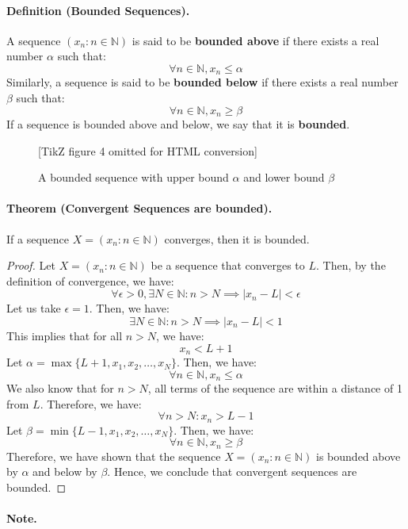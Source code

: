 \documentclass[openany]{book}
\numberwithin{equation}{section}
\begin{document}
\paragraph{Definition (Bounded Sequences).}

    A sequence $(x_n : n \in \mathbb{N})$ is said to be \textbf{bounded above} if there exists a real number $\alpha$ such that:
    $$\forall n \in \mathbb{N}, x_n \leq \alpha$$
    Similarly, a sequence is said to be \textbf{bounded below} if there exists a real number $\beta$ such that:
    $$\forall n \in \mathbb{N}, x_n \geq \beta$$
    If a sequence is bounded above and below, we say that it is \textbf{bounded}.
\par
\begin{figure}[H]
    \centering
    

[TikZ figure 4 omitted for HTML conversion]

    \caption{A bounded sequence with upper bound $\alpha$ and lower bound $\beta$}
    \label{fig:bounded_sequence}
\end{figure}
\paragraph{Theorem (Convergent Sequences are bounded).}

    If a sequence $X = (x_n : n \in \mathbb{N})$ converges, then it is bounded. 
\par
\begin{proof}
    Let $X = (x_n : n \in \mathbb{N})$ be a sequence that converges to $L$. Then, by the definition of convergence, we have:
    $$\forall \epsilon > 0, \exists N \in \mathbb{N}: n > N \implies |x_n - L| < \epsilon$$
    Let us take $\epsilon = 1$. Then, we have:
    $$\exists N \in \mathbb{N}: n > N \implies |x_n - L| < 1$$
    This implies that for all $n > N$, we have:
    $$x_n < L + 1$$
    Let $\alpha = \max\{L + 1, x_1, x_2, \ldots, x_N\}$. 
    Then, we have:
    $$\forall n \in \mathbb{N}, x_n \leq \alpha$$
    We also know that for $n > N$, all terms of the sequence are within a distance of 1 from $L$. Therefore, we have:
    $$\forall n> N: x_n > L - 1$$
    Let $\beta = \min\{L - 1, x_1, x_2, \ldots, x_N\}$. 
    Then, we have:
    $$\forall n \in \mathbb{N}, x_n \geq\beta$$
    Therefore, we have shown that the sequence $X = (x_n : n \in \mathbb{N})$ is bounded above by $\alpha$ and below by $\beta$. Hence, we conclude that convergent sequences are bounded.
\end{proof}
\paragraph{Note.}
\end{document}
